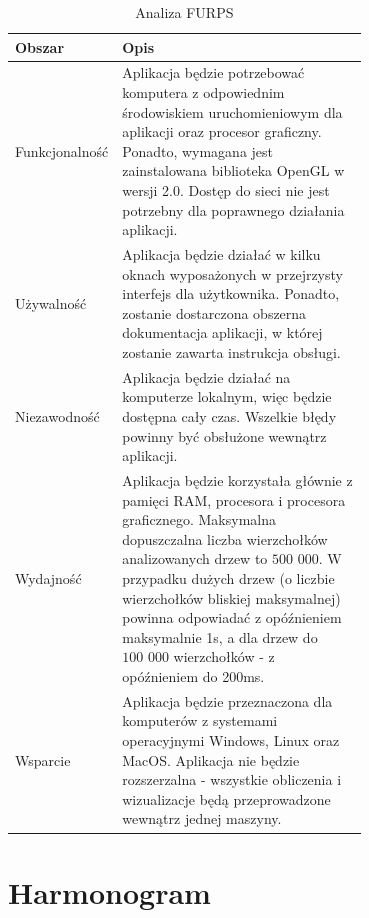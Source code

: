 \documentclass{article}
\let\oldsection\section
\renewcommand\section{\clearpage\oldsection}
\begin{document}
	\begin{table}[h!]
	\centering
	\begin{tabular}{|l|p{0.7\linewidth}|}
		\hline
		Obszar         & \textbf{Opis} \\ \hline
		Funkcjonalność & Aplikacja będzie potrzebować komputera z odpowiednim środowiskiem uruchomieniowym dla aplikacji oraz procesor graficzny. Ponadto, wymagana jest zainstalowana biblioteka OpenGL w wersji 2.0. Dostęp do sieci nie jest potrzebny dla poprawnego działania aplikacji.  \\ \hline
		Używalność     & Aplikacja będzie działać w kilku oknach wyposażonych w przejrzysty interfejs dla użytkownika. Ponadto, zostanie dostarczona obszerna dokumentacja aplikacji, w której zostanie zawarta instrukcja obsługi.  \\ \hline
		Niezawodność   & Aplikacja będzie działać na komputerze lokalnym, więc będzie dostępna cały czas. Wszelkie błędy powinny być obsłużone wewnątrz aplikacji.  \\ \hline
		Wydajność      & Aplikacja będzie korzystała głównie z pamięci RAM, procesora i procesora graficznego. Maksymalna dopuszczalna liczba wierzchołków analizowanych drzew to $500 \,\,000$. W przypadku dużych drzew (o liczbie wierzchołków bliskiej maksymalnej) powinna odpowiadać z opóźnieniem maksymalnie 1s, a dla drzew do $100\,\,000$ wierzchołków - z opóźnieniem do 200ms.  \\ \hline
		Wsparcie       & Aplikacja będzie przeznaczona dla komputerów z systemami operacyjnymi Windows, Linux oraz MacOS. Aplikacja nie będzie rozszerzalna - wszystkie obliczenia i wizualizacje będą przeprowadzone wewnątrz jednej maszyny.  \\ \hline
	\end{tabular}
	\caption{Analiza FURPS}
	\label{tab:furps}
	\end{table}
	
	
	\section{Harmonogram}
\end{document}
